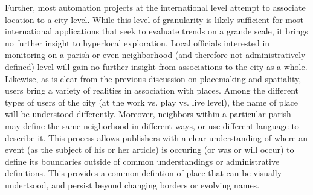 Further, most automation projects at the international level attempt to associate location to a city level. While this level of granularity is likely sufficient for most international applications that seek to evaluate trends on a grande scale, it brings no further insight to hyperlocal exploration. Local officials interested in monitoring on a parish or even neighborhood (and therefore not administratively defined) level will gain no further insight from associations to the city as a whole. Likewise, as is clear from the previous discussion on placemaking and spatiality, users bring a variety of realities in association with places. Among the different types of users of the city (at the work vs. play vs. live level), the name of place will be understood differently. Moreover, neighbors within a particular parish may define the same neighorhood in different ways, or use different language to describe it. This process allows publishers with a clear understanding of where an event (as the subject of his or her article) is occuring (or was or will occur) to define its boundaries outside of common understandings or administrative definitions. This provides a common defintion of place that can be visually undertsood, and persist beyond changing borders or evolving names.\\










